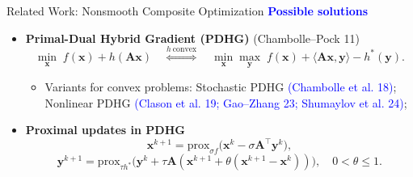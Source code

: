 \documentclass[mathserif,compress,override,9pt]{beamer}
\numberwithin{equation}{section}
\newcommand{\prox}{\mathrm{prox}}
\newcommand{\bx}{\bm{x}}
\newcommand{\by}{\bm{y}}
\newcommand{\bA}{\bm{A}}
\newcommand{\blue}[1]{\textcolor{blue}{#1}}
\theoremstyle{remark}
\begin{document}
\begin{frame}[t]{Related Work: Nonsmooth Composite Optimization}
\vspace{0.2cm}
{\blue{\textbf{Possible solutions}}}
\vspace{-0.08cm}
\begin{itemize}
  \setlength{\itemsep}{0.005cm}
  \item[\blue{$\blacktriangleright$}] {{\textbf{Primal-Dual Hybrid Gradient (PDHG)}}}
  {\footnotesize {(Chambolle--Pock 11)}}\\[-0.07cm]
  {
  \[
  {\min_{\bx}\; f(\bx)+h(\bA\bx)
  \quad\overset{h\ \mathrm{convex}}{\Longleftrightarrow}\quad
  \min_{\bx}\max_{\by}\; f(\bx)+\langle\bA\bx,\by\rangle-h^*(\by).}
  \]
  }
    \begin{itemize}
    \setlength{\itemsep}{0pt}
    \item[\blue{$\bullet$}] {\footnotesize Variants for convex problems: Stochastic PDHG \blue{(Chambolle et al. 18)}; Nonlinear PDHG \blue{(Clason et al. 19; Gao--Zhang 23; Shumaylov et al. 24)}};
  \end{itemize}

  \item[\blue{$\blacktriangleright$}] {{\textbf{Proximal updates in PDHG}}}
  {\footnotesize
  \[
  {\bx^{k+1}=\prox_{\sigma f}\!\bigl(\bx^k-\sigma\bA^\top\by^k\bigr),}
  \]
  \[
  {\by^{k+1}=\prox_{\tau h^*}\!\bigl(\by^k+\tau\bA(\bx^{k+1}+\theta(\bx^{k+1}-\bx^k))\bigr),\quad 0<\theta\leq 1.}
  \]
  }

\end{itemize}
\end{frame}





\end{document}
